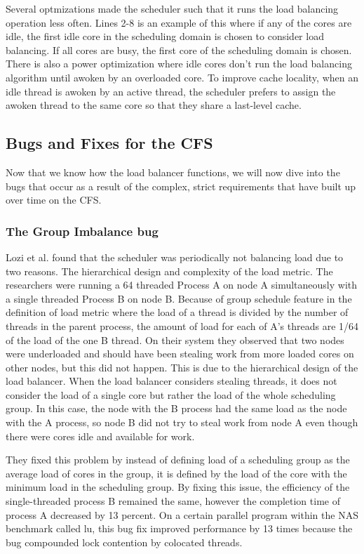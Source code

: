 \documentclass{sig-alternate}
\begin{document}
Several optmizations made the scheduler such that it runs the load balancing operation less often. Lines 2-8 is an example of this where if any of the cores are idle, the first idle core in the scheduling domain is chosen to consider load balancing. If all cores are busy, the first core of the scheduling domain is chosen. There is also a power optimization where idle cores don't run the load balancing algorithm until awoken by an overloaded core. To improve cache locality, when an idle thread is awoken by an active thread, the scheduler prefers to assign the awoken thread to the same core so that they share a last-level cache.~\cite{Lozi:2016}

\subsection{Bugs and Fixes for the CFS}
\label{sec:cfsbugs}

Now that we know how the load balancer functions, we will now dive into the bugs that occur as a result of the complex, strict requirements that have built up over time on the CFS.

\subsubsection{The Group Imbalance bug}
\label{sec:cfsfault_grpimbalance}

Lozi et al. found that the scheduler was periodically not balancing load due to two reasons. The hierarchical design and complexity of the load metric. The researchers were running a 64 threaded  Process A on node A simultaneously with a single threaded Process B on node B. Because of group schedule feature in the definition of load metric where the load of a thread is divided by the number of threads in the parent process, the amount of load for each of A's threads are 1/64 of the load of the one B thread. On their system they observed that two nodes were underloaded and should have been stealing work from more loaded cores on other nodes, but this did not happen. This is due to the hierarchical design of the load balancer. When the load balancer considers stealing threads, it does not consider the load of a single core but rather the load of the whole scheduling group. In this case, the node with the B process had the same load as the node with the A process, so node B did not try to steal work from node A even though there were cores idle and available for work.~\cite{Lozi:2016}

They fixed this problem by instead of defining load of a scheduling group as the average load of cores in the group, it is defined by the load of the core with the minimum load in the scheduling group. By fixing this issue, the efficiency of the single-threaded process B remained the same, however the completion time of process A decreased by 13 percent. On a certain parallel program within the NAS benchmark called lu, this bug fix improved performance by 13 times because the bug compounded lock contention by colocated threads.~\cite{Lozi:2016}
\end{document}
